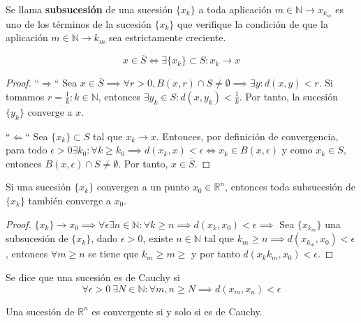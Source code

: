 \begin{definición}[Subsucesión]
    Se llama \textbf{subsucesión} de una sucesión \( \{x_k\} \) a toda aplicación $m \in \mathbb{N} \to x_{k_m}$ es uno de los términos de la sucesión \( \{x_k\} \) que verifique la condición de que la aplicación $m \in \mathbb{N} \to k_m$ sea estrictamente creciente.
\end{definición}
\begin{proposición}
    $$ x \in \overline{S} \Leftrightarrow \exists \{x_k\} \subset S : x_k \to x$$
\end{proposición}
\begin{proof}
    ``$\Rightarrow$``
    Sea $x \in \overline{S} \implies \forall r > 0, B(x, r) \cap S \neq \emptyset \implies \exists y: d(x,y) < r$. Si tomamos $r = \frac{1}{k} : k \in \mathbb{N}$, entonces $\exists y_k \in S : d(x, y_k) < \frac{1}{k}$. Por tanto, la sucesión \( \{y_k\} \) converge a \( x \).

    ``$\Leftarrow$``
    Sea \( \{x_k\} \subset S \) tal que \( x_k \to x \). Entonces, por definición de convergencia, para todo $\epsilon > 0 \exists k_0 : \forall k \geq k_0 \implies d(x_k, x) < \epsilon \iff x_k \in B(x, \epsilon)$ y como $x_k \in S$, entonces \( B(x, \epsilon) \cap S \neq \emptyset \). Por tanto, \( x \in \overline{S} \).
\end{proof}
\begin{teorema}
    Si una sucesión \( \{x_k\} \) convergen a un punto \( x_0 \in \mathbb{R}^n \), entonces toda subsucesión de \( \{x_k\} \) también converge a \( x_0 \).
\end{teorema}
\begin{proof}
    $\{x_k\} \to x_0 \implies \forall \epsilon \exists n \in \mathbb{N} : \forall k \geq n \implies d(x_k, x_0) < \epsilon \implies$
    Sea $\{x_{k_m}\}$ una subsucesión de \( \{x_k\} \), dado $\epsilon > 0$, existe \( n \in \mathbb{N} \) tal que \( k_m \geq n \implies d(x_{k_m}, x_0) < \epsilon \), entonces $\forall m \geq n$ se tiene que $k_m \geq m \geq $ y por tanto $d(x_k{k_m}, x_0) < \epsilon$. 
\end{proof}
\begin{definición}
    Se dice que una sucesión es de Cauchy si
    $$\forall \epsilon > 0 \ \exists N \in \mathbb{N} : \forall m, n \geq N \implies d(x_m, x_n) < \epsilon$$
\end{definición}

\begin{teorema}
    Una sucesión de $\mathbb{R}^n$ es convergente si y solo si es de Cauchy.
\end{teorema}

